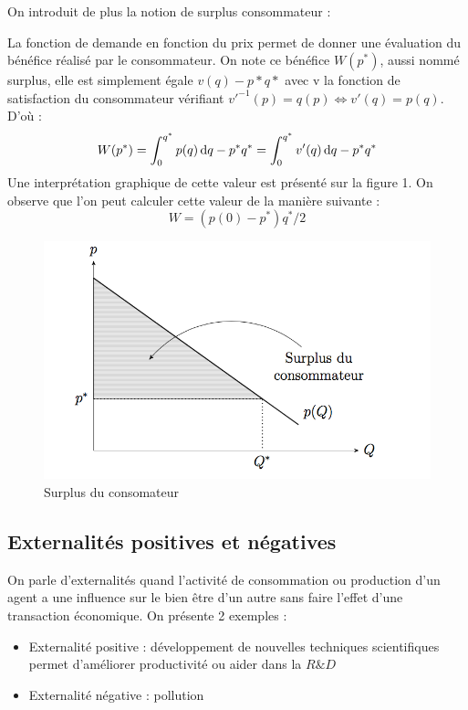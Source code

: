 On introduit de plus la notion de surplus consommateur : 
\begin{tcolorbox}[title=Surplus consommateur]
	La fonction de demande en fonction du prix permet de donner une évaluation du bénéfice réalisé par le consommateur. On note ce bénéfice $W(p^*)$, aussi nommé surplus, elle est simplement égale $v(q)-p*q*$ avec v la fonction de satisfaction du consommateur vérifiant $v'^{-1}(p)=q(p) \Leftrightarrow v'(q)=p(q)$. D'où :
	\[
		W(p^*)= \int_0^{q^*}p(q)\operatorname{d}\! q - p^*q^* = \int_0^{q^*}v'(q)\operatorname{d}\! q - p^*q^*
	\]
Une interprétation graphique de cette valeur est présenté sur la figure 1. On observe que l'on peut calculer cette valeur de la manière suivante :
\[
	W=(p(0)-p^*)q^*/2
\]

\end{tcolorbox}

\begin{figure}[h]
\begin{center}
\includegraphics[scale=0.7]{./img/IM1}
\caption{Surplus du consomateur}
\end{center}
\end{figure}



\subsection{Externalités positives et négatives} %
\label{sub:externalites_positives_et_negatives}

On parle d'externalités quand l'activité de consommation ou production d'un agent a une influence sur le bien être d'un autre sans faire l'effet d'une transaction économique. On présente 2 exemples :
\begin{itemize}
	\item Externalité positive : développement de nouvelles techniques scientifiques permet d'améliorer productivité ou aider dans la $R\&D$
	\item Externalité négative : pollution
\end{itemize}

